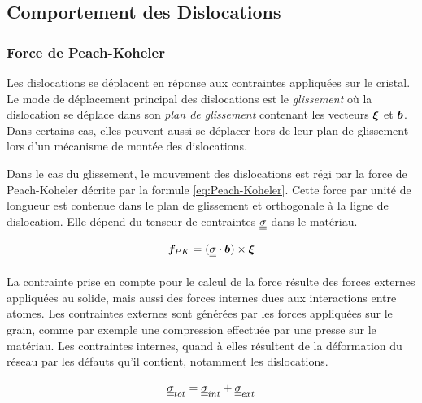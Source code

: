 \documentclass[11pt,class=article,float=false,crop=false]{standalone}
\begin{document}



\subsection{Comportement des Dislocations}
\label{sec:DD:comportement}

\subsubsection{Force de Peach-Koheler}

Les dislocations se déplacent en réponse aux contraintes appliquées sur le cristal. Le mode de déplacement principal des dislocations est le \textit{glissement} où la dislocation se déplace dans son \textit{plan de glissement} contenant les vecteurs $\bm{\xi}$ et $\bm{b}$. Dans certains cas, elles peuvent aussi se déplacer hors de leur plan de glissement lors d'un mécanisme de montée des dislocations.

Dans le cas du glissement, le mouvement des dislocations est régi par la force de Peach-Koheler  décrite par la formule \ref{eq:Peach-Koheler}. Cette force par unité de longueur est contenue dans le plan de glissement et orthogonale à la ligne de dislocation. Elle dépend du tenseur de contraintes $\underline{\underline{\sigma } }$ dans le matériau.

\begin{equation}
\bm{f}_{PK} = (\underline{\underline{\sigma } } \cdot \bm{b}) \times \bm{\xi}
\label{eq:Peach-Koheler}
\end{equation}

\paragraph{}
La contrainte prise en compte pour le calcul de la force résulte des forces externes appliquées au solide, mais aussi des forces internes dues aux interactions entre atomes. Les contraintes externes sont générées par les forces appliquées sur le grain, comme par exemple une compression effectuée par une presse sur le matériau. Les contraintes internes, quand à elles résultent de la déformation du réseau par les défauts qu'il contient, notamment les dislocations.

\begin{equation}
\underline{\underline{\sigma } } _{tot} = \underline{\underline{\sigma } } _{int} + \underline{\underline{\sigma } } _{ext}
\label{eq:contraintes}
\end{equation}
\end{document}
